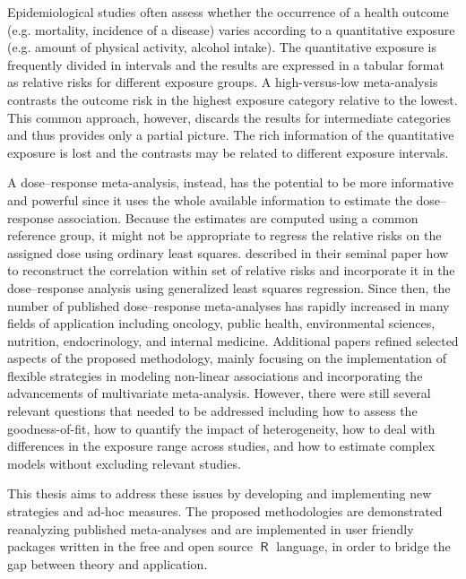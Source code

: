 \documentclass[11pt,a4paper,twoside,openany]{book}\usepackage{knitr}
\DeclareMathOperator{\R}{\textsf{R}}
\begin{document}
{{Epidemiological studies often assess whether the occurrence of a health outcome (e.g. mortality, incidence of a disease) varies according to a quantitative exposure (e.g. amount of physical activity, alcohol intake). 
The quantitative exposure is frequently divided in intervals and the results are expressed in a tabular format as relative risks for different exposure groups. A high-versus-low meta-analysis contrasts the outcome risk in the highest exposure category relative to the lowest. This common approach, however, discards the results for intermediate categories and thus provides only a partial picture. The rich information of the quantitative exposure is lost and the contrasts may be related to different exposure intervals.

A dose--response meta-analysis, instead, has the potential to be more informative and powerful since it uses the whole available information to estimate the dose--response association. Because the estimates are computed using a common reference group, it might not be appropriate to regress the relative risks on the assigned dose using ordinary least squares. \cite{greenland1992methods} described in their seminal paper how to reconstruct the correlation within set of relative risks and incorporate it in the dose--response analysis using generalized least squares regression. Since then, the number of published dose--response meta-analyses has rapidly increased in many fields of application including oncology, public health, environmental sciences, nutrition, endocrinology, and internal medicine. 
Additional papers refined selected aspects of the proposed methodology, mainly focusing on the implementation of flexible strategies in modeling non-linear associations and incorporating the advancements of multivariate meta-analysis. However, there were still several relevant questions that needed to be addressed including how to assess the goodness-of-fit, how to quantify the impact of heterogeneity, how to deal with differences in the exposure range across studies, and how to estimate complex models without excluding relevant studies.

This thesis aims to address these issues by developing and implementing new strategies and ad-hoc measures. The proposed methodologies are demonstrated reanalyzing published meta-analyses and are implemented in user friendly packages written in the free and open source $\R$ language, in order to bridge the gap between theory and application.


}}
\end{document}
